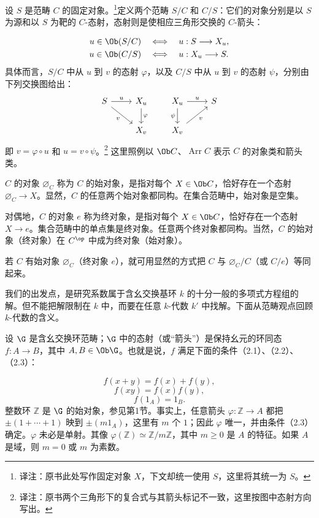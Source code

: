 设 $S$ 是范畴 $C$ 的固定对象。\footnote{译注：原书此处写作固定对象 $X$，下文却统一使用 $S$，这里将其统一为 $S$。}定义两个范畴 $S/C$ 和 $C/S$：它们的对象分别是以 $S$ 为源和以 $S$ 为靶的 $C$-态射，态射则是使相应三角形交换的 $C$-箭头：

\[
\begin{aligned}
u\in\Ob(S/C)&\quad\Longleftrightarrow\quad u:S\longrightarrow X_u,\\
u\in\Ob(C/S)&\quad\Longleftrightarrow\quad u:X_u\longrightarrow S.
\end{aligned}
\]
具体而言，$S/C$ 中从 $u$ 到 $v$ 的态射 $\varphi$，以及 $C/S$ 中从 $u$ 到 $v$ 的态射 $\psi$，分别由下列交换图给出：
\[
\begin{tikzcd}[ampersand replacement=\&]
S\arrow[r,"u"]\arrow[dr,"v"']\&X_u\arrow[d,"\varphi"]\\
\&X_v
\end{tikzcd}
\qquad
\begin{tikzcd}[ampersand replacement=\&]
X_u\arrow[r,"u"]\arrow[d,"\psi"']\&S\\
X_v\arrow[ur,"v"']\&
\end{tikzcd}
\]
即 $v=\varphi\circ u$ 和 $u=v\circ\psi$。\footnote{译注：原书两个三角形下的复合式与其箭头标记不一致，这里按图中态射方向写出。}
这里照例以 $\Ob C$、$\operatorname{Arr}C$ 表示 $C$ 的对象类和箭头类。

$C$ 的对象 $\varnothing_C$ 称为 $C$ 的始对象，是指对每个 $X\in\Ob C$，恰好存在一个态射 $\varnothing_C\to X$。显然，$C$ 的任意两个始对象都同构。在集合范畴中，始对象是空集。

对偶地，$C$ 的对象 $e$ 称为终对象，是指对每个 $X\in\Ob C$，恰好存在一个态射 $X\to e$。集合范畴中的单点集是终对象。任意两个终对象都同构。当然，$C$ 的始对象（终对象）在 $C^{\op}$ 中成为终对象（始对象）。

若 $C$ 有始对象 $\varnothing_C$（终对象 $e$），就可用显然的方式把 $C$ 与 $\varnothing_C/C$（或 $C/e$）等同起来。

我们的出发点，是研究系数属于含幺交换基环 $k$ 的十分一般的多项式方程组的解。但不能把解限制在 $k$ 中，而要在任意 $k$-代数 $k'$ 中找解。下面从范畴观点回顾 $k$-代数的含义。

设 $\G$ 是含幺交换环范畴；$\G$ 中的态射（或“箭头”）是保持幺元的环同态 $f:A\to B$，其中 $A,B\in\Ob\G$。也就是说，$f$ 满足下面的条件（2.1）、（2.2）、（2.3）：

\[
f(x+y)=f(x)+f(y),\tag{2.1}
\]
\[
f(xy)=f(x)f(y),\tag{2.2}
\]
\[
f(1_A)=1_B.\tag{2.3}
\]
整数环 $\mathbb Z$ 是 $\G$ 的始对象，参见第1节。事实上，任意箭头 $\varphi:\mathbb Z\to A$ 都把 $\pm(1+\cdots+1)$ 映到 $\pm(m1_A)$，这里有 $m$ 个 $1$；因此 $\varphi$ 唯一，并由条件（2.3）确定。$\varphi$ 未必是单射。其像 $\varphi(\mathbb Z)\simeq\mathbb Z/m\mathbb Z$，其中 $m\ge0$ 是 $A$ 的特征。如果 $A$ 是域，则 $m=0$ 或 $m$ 为素数。

